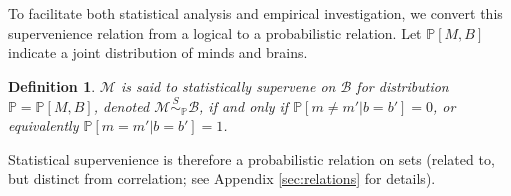 \documentclass{article}
\newcommand{\mB}{\mathcal{B}}
\newcommand{\mM}{\mathcal{M}}
\newcommand{\PP}{\mathbb{P}}           %
\providecommand{\mc}[1]{\mathcal{#1}}
\newtheorem{defi}{Definition}
\begin{document}
To facilitate both statistical analysis and empirical investigation, we convert this supervenience relation from a logical to a probabilistic relation.  Let $\PP[M,B]$ indicate a joint distribution of minds and brains.
\begin{defi}
\label{def1} 
$\mM$ is said to \textit{statistically supervene} on $\mB$ for distribution $\PP=\PP[M,B]$, denoted $\mM \overset{S}{\sim}_\PP \mB$, if and only if $\PP[m \neq m' | b=b']=0$, or equivalently $\PP[m = m' | b = b']=1$. %
\end{defi}
\noindent Statistical supervenience is therefore a probabilistic relation on sets (related to, but distinct from correlation; see Appendix \ref{sec:relations} for details).  

% 
\end{document}
